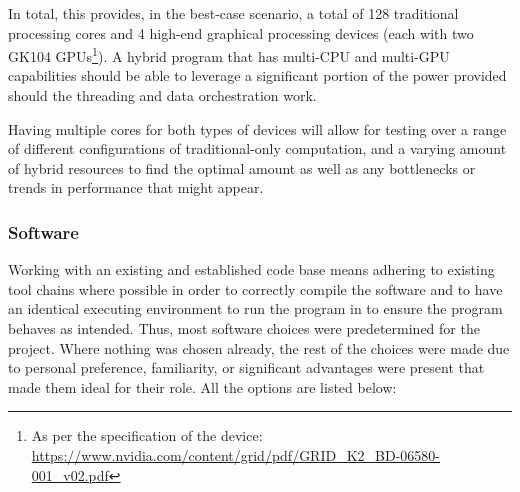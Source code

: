 \documentclass[conference]{IEEEtran}
\begin{document}
In total, this provides, in the best-case scenario, a total of 128 traditional processing cores and 4 high-end graphical processing devices (each with two GK104 GPUs\footnote{As per the specification of the device: \url{https://www.nvidia.com/content/grid/pdf/GRID_K2_BD-06580-001_v02.pdf}}). A hybrid program that has multi-CPU and multi-GPU capabilities should be able to leverage a significant portion of the power provided should the threading and data orchestration work.

Having multiple cores for both types of devices will allow for testing over a range of different configurations of traditional-only computation, and a varying amount of hybrid resources to find the optimal amount as well as any bottlenecks or trends in performance that might appear.

\subsubsection{Software}

Working with an existing and established code base means adhering to existing tool chains where possible in order to correctly compile the software and to have an identical executing environment to run the program in to ensure the program behaves as intended. Thus, most software choices were predetermined for the project. Where nothing was chosen already, the rest of the choices were made due to personal preference, familiarity, or significant advantages were present that made them ideal for their role. All the options are listed below:
\end{document}
